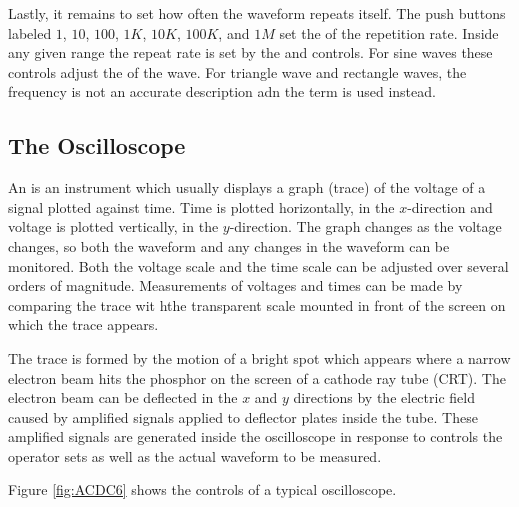 \documentclass[12pt, a4paper, oneside, openright, titlepage]{book}
\begin{document}
\noindent Lastly, it remains to set how often the waveform repeats itself. The push buttons labeled $1$, $10$, $100$, $1K$, $10K$, $100K$, and $1M$ set the  of the repetition rate. Inside any given range the repeat rate is set by the  and  controls. For sine waves these controls adjust the  of the wave. For triangle wave and rectangle waves, the frequency is not an accurate description adn the term  is used instead.

\subsection{The Oscilloscope}

An  is an instrument which usually displays a graph (trace) of the voltage of a signal plotted against time. Time is plotted horizontally, in the $x$-direction and voltage is plotted vertically, in the $y$-direction. The graph changes as the voltage changes, so both the waveform and any changes in the waveform can be monitored. Both the voltage scale and the time scale can be adjusted over several orders of magnitude. Measurements of voltages and times can be made by comparing the trace wit hthe transparent scale mounted in front of the screen on which the trace appears.

\noindent The trace is formed by the motion of a bright spot which appears where a narrow electron beam hits the phosphor on the screen of a cathode ray tube (CRT). The electron beam can be deflected in the $x$ and $y$ directions by the electric field caused by amplified signals applied to deflector plates inside the tube. These amplified signals are generated inside the oscilloscope in response to controls the operator sets as well as the actual waveform to be measured.

\noindent Figure \ref{fig:ACDC6} shows the controls of a typical oscilloscope.
\end{document}
